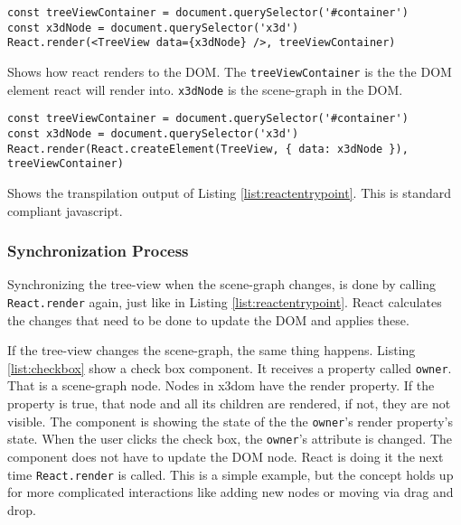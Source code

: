 \begin{listing}
  \begin{verbatim}
const treeViewContainer = document.querySelector('#container')
const x3dNode = document.querySelector('x3d')
React.render(<TreeView data={x3dNode} />, treeViewContainer)
  \end{verbatim}
  \caption{Shows how react renders to the \gls{DOM}. The \texttt{treeViewContainer} is the the \gls{DOM} element react will render into. \texttt{x3dNode} is the scene-graph in the \gls{DOM}.}
  \label{list:reactentrypoint}
\end{listing}

\begin{listing}
  \begin{verbatim}
const treeViewContainer = document.querySelector('#container')
const x3dNode = document.querySelector('x3d')
React.render(React.createElement(TreeView, { data: x3dNode }), treeViewContainer)
  \end{verbatim}
  \caption{Shows the transpilation output of Listing \ref{list:reactentrypoint}. This is standard compliant javascript.}
  \label{list:reacttranspiled}
\end{listing}

\subsubsection{Synchronization Process}
\label{synchronization-process}

Synchronizing the tree-view when the scene-graph changes, is done by calling
\texttt{React.render} again, just like in Listing \ref{list:reactentrypoint}. React
calculates the changes that need to be done to update the \gls{DOM} and applies these.

If the tree-view changes the scene-graph, the same thing happens. Listing
\ref{list:checkbox} show a check box component. It receives a property called
\texttt{owner}. That is a scene-graph node. Nodes in x3dom have the render
property. If the property is true, that node and all its children are rendered,
if not, they are not visible. The component is showing the state of the the
\texttt{owner}'s render property's state. When the user clicks the check box, the
\texttt{owner}'s attribute is changed. The component does not have to update the
\gls{DOM} node. React is doing it the next time \texttt{React.render} is called. This
is a simple example, but the concept holds up for more complicated interactions
like adding new nodes or moving via drag and drop.

